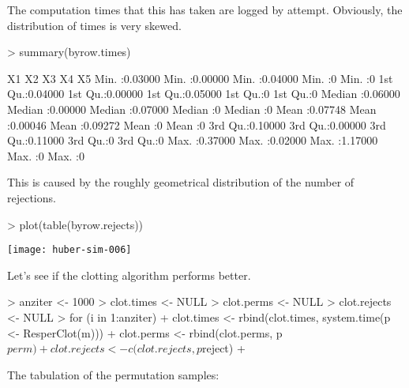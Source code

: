 \documentclass{scrartcl}
\begin{document}
The computation times that this has taken are logged by attempt. Obviously, the distribution of times is very skewed. 

\begin{Schunk}
\begin{Sinput}
> summary(byrow.times)
\end{Sinput}
\begin{Soutput}
       X1                X2                X3                X4          X5   
 Min.   :0.03000   Min.   :0.00000   Min.   :0.04000   Min.   :0   Min.   :0  
 1st Qu.:0.04000   1st Qu.:0.00000   1st Qu.:0.05000   1st Qu.:0   1st Qu.:0  
 Median :0.06000   Median :0.00000   Median :0.07000   Median :0   Median :0  
 Mean   :0.07748   Mean   :0.00046   Mean   :0.09272   Mean   :0   Mean   :0  
 3rd Qu.:0.10000   3rd Qu.:0.00000   3rd Qu.:0.11000   3rd Qu.:0   3rd Qu.:0  
 Max.   :0.37000   Max.   :0.02000   Max.   :1.17000   Max.   :0   Max.   :0  
\end{Soutput}
\end{Schunk}

This is caused by the roughly geometrical distribution of the number of rejections. 

\begin{Schunk}
\begin{Sinput}
> plot(table(byrow.rejects))
\end{Sinput}
\end{Schunk}
\texttt{[image: huber-sim-006]}

Let's see if the clotting algorithm performs better.

\begin{Schunk}
\begin{Sinput}
> anziter <- 1000
> clot.times <- NULL
> clot.perms <- NULL
> clot.rejects <- NULL
> for (i in 1:anziter) {
+     clot.times <- rbind(clot.times, system.time(p <- ResperClot(m)))
+     clot.perms <- rbind(clot.perms, p$perm)
+     clot.rejects <- c(clot.rejects, p$reject)
+ }
\end{Sinput}
\end{Schunk}

The tabulation of the permutation samples:
\end{document}
